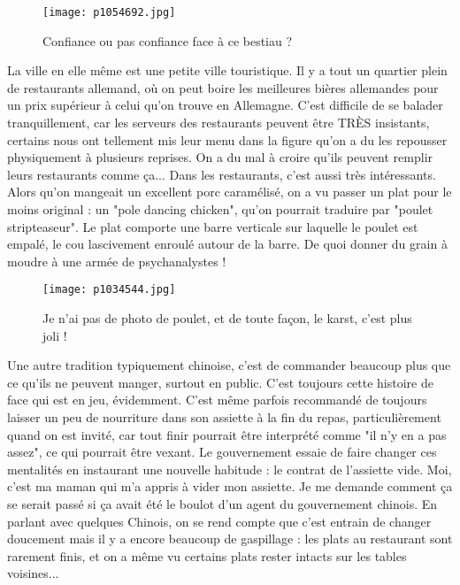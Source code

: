 \documentclass{book}
\begin{document}
\begin{figure}[h]
\centering
\texttt{[image: p1054692.jpg]}
\caption*{Confiance ou pas confiance face à ce bestiau ?}
\end{figure}

La ville en elle même est une petite ville touristique. Il y a tout un quartier plein de restaurants allemand, où on peut boire les meilleures bières allemandes pour un prix supérieur à celui qu'on trouve en Allemagne. C'est difficile de se balader tranquillement, car les serveurs des restaurants peuvent être TRÈS insistants, certains nous ont tellement mis leur menu dans la figure qu'on a du les repousser physiquement à plusieurs reprises. On a du mal à croire qu'ils peuvent remplir leurs restaurants comme ça... Dans les restaurants, c'est aussi très intéressants. Alors qu'on mangeait un excellent porc caramélisé, on a vu passer un plat pour le moins original : un "pole dancing chicken", qu'on pourrait traduire par "poulet stripteaseur". Le plat comporte une barre verticale sur laquelle le poulet est empalé, le cou lascivement enroulé autour de la barre. De quoi donner du grain à moudre à une armée de psychanalystes !


\begin{figure}[h]
\centering
\texttt{[image: p1034544.jpg]}
\caption*{Je n'ai pas de photo de poulet, et de toute façon, le karst, c'est plus joli !}
\end{figure}

Une autre tradition typiquement chinoise, c'est de commander beaucoup plus que ce qu'ils ne peuvent manger, surtout en public. C'est toujours cette histoire de face qui est en jeu, évidemment. C'est même parfois recommandé de toujours laisser un peu de nourriture dans son assiette à la fin du repas, particulièrement quand on est invité, car tout finir pourrait être interprété comme "il n'y en a pas assez", ce qui pourrait être vexant. Le gouvernement essaie de faire changer ces mentalités en instaurant une nouvelle habitude : le contrat de l'assiette vide. Moi, c'est ma maman qui m'a appris à vider mon assiette. Je me demande comment ça se serait passé si ça avait été le boulot d'un agent du gouvernement chinois. En parlant avec quelques Chinois, on se rend compte que c'est entrain de changer doucement mais il y a encore beaucoup de gaspillage : les plats au restaurant sont rarement finis, et on a même vu certains plats rester intacts sur les tables voisines...
\end{document}
